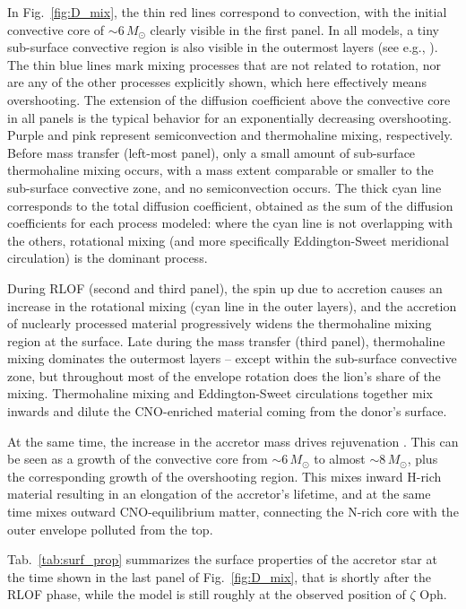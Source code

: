 \documentclass[twocolumn,twocolappendix,trackchanges]{aastex63}
\DeclareRobustCommand{\Figref}[1]{Fig.~\ref{#1}}
\DeclareRobustCommand{\Tabref}[1]{Tab.~\ref{#1}}
\newcommand{\zoph}{$\zeta$ Oph}
\begin{document}
In \Figref{fig:D_mix}, the thin red lines correspond to convection,
with the initial convective core of
$\sim$$6\,M_\odot$ clearly visible in the first panel. In all models, a tiny sub-surface convective region is also visible in the outermost layers (see e.g., \citealt{cantiello:21}).  The thin blue lines mark mixing processes that are not related to rotation, nor are any of the other processes explicitly shown, which here effectively means overshooting. The extension of the diffusion coefficient above the convective core in all panels is the typical behavior for an exponentially decreasing overshooting. Purple and pink represent semiconvection and thermohaline mixing, respectively. Before mass transfer (left-most panel), only a small amount of sub-surface thermohaline mixing occurs, with a mass extent comparable or smaller to the sub-surface convective zone, and no semiconvection occurs. The thick cyan line corresponds to the total diffusion coefficient, obtained as the sum of the diffusion coefficients for each process modeled: where the cyan line is not overlapping with the others, rotational mixing (and more specifically Eddington-Sweet meridional circulation) is the dominant process.

During RLOF (second and third panel), the spin up due to accretion causes an increase in the rotational mixing (cyan line in the outer layers), and the accretion of nuclearly processed material progressively widens the thermohaline mixing region at the surface. Late during the mass transfer (third panel), thermohaline mixing dominates the outermost layers -- except within the sub-surface convective zone, but throughout most of the envelope rotation does the lion's share of the mixing. Thermohaline mixing and Eddington-Sweet circulations together mix inwards and dilute the CNO-enriched material coming from the donor's surface.

At the same time, the increase in the accretor mass drives
rejuvenation \citep[e.g.,][]{schneider:16}. This can be seen as a
growth of the convective core from
$\sim$$6\,M_\odot$ to almost $\sim$$8\,M_\odot$, plus the
corresponding growth of the overshooting region. This mixes inward
H-rich material resulting in an elongation of the accretor's lifetime,
and at the same time mixes outward CNO-equilibrium matter, connecting
the N-rich core with the outer envelope polluted from the top.



\Tabref{tab:surf_prop} summarizes the surface properties of the
accretor star at the time shown in the last panel of
\Figref{fig:D_mix}, that is shortly after the RLOF phase, while the
model is still roughly at the observed position of \zoph.
\end{document}
